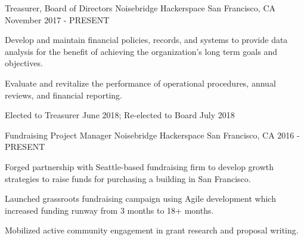

\begin{cventries}

  \cventry
    {Treasurer, Board of Directors} %
    {Noisebridge Hackerspace} %
    {San Francisco, CA} %
    {November 2017 - PRESENT} %
    {
      \begin{cvitems} %
        \item {Develop and maintain financial policies, records, and systems to provide data analysis for the benefit of achieving the organization's long term goals and objectives.}
        \item {Evaluate and revitalize the performance of operational procedures, annual reviews, and financial reporting.}
        \item {Elected to Treasurer June 2018; Re-elected to Board July 2018}       
      \end{cvitems}
    }

  \cventry
    {Fundraising Project Manager} %
    {Noisebridge Hackerspace} %
    {San Francisco, CA} %
    {2016 - PRESENT} %
    {
      \begin{cvitems} %
        \item {Forged partnership with Seattle-based fundraising firm to develop growth strategies to raise funds for purchasing a building in San Francisco.}
        \item {Launched grassroots fundraising campaign using Agile development which increased funding runway from 3 months to 18+ months.}
        \item {Mobilized active community engagement in grant research and proposal writing.}
      \end{cvitems}
    }


\end{cventries}
